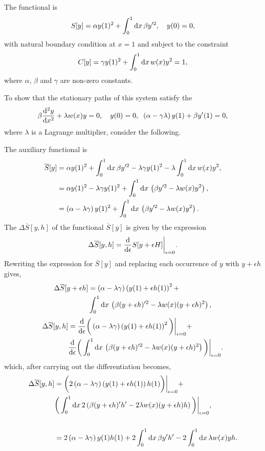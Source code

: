 The functional is
\begin{equation*}
S[y] = \alpha y(1)^2 + \int_{0}^{1}\mathrm{d} x\, \beta y^{\prime 2},\quad y(0) = 0,
\end{equation*}
with natural boundary condition at $x=1$ and subject to the constraint
\[
	C[y] = \gamma y(1)^2 + \int_{0}^{1}\mathrm{d} x\, w(x) y^2 = 1,
\]
where $\alpha$, $\beta$ and $\gamma$ are non-zero constants. 

To show that the stationary paths of this system satisfy the \el 
\[
	\beta \frac{\mathrm{d}^2y}{\mathrm{d}x^2} +  \lambda w(x) y = 0,\quad y(0)=0,\;\; \left(\alpha-\gamma\lambda\right) y(1) + \beta y^\prime(1)=0,
\]
where $\lambda$ is a Lagrange multiplier, consider the following.

The auxiliary functional is
\begin{align*}
	\overline{S}[y] &= \alpha y(1)^2 + \int_{0}^{1}\mathrm{d} x\, \beta y^{\prime 2} - \lambda\gamma y(1)^2 - \lambda\int_{0}^{1}\mathrm{d} x\, w(x) y^2,\\
	&= \alpha y(1)^2 - \lambda\gamma y(1)^2 + \int_{0}^{1}\mathrm{d} x\, \left(\beta y^{\prime 2}  -  \lambda w(x) y^2\right),\\
	&= \left(\alpha- \lambda\gamma\right) y(1)^2 + \int_{0}^{1}\mathrm{d} x\, \left(\beta y^{\prime 2}  - \lambda w(x) y^2\right).
\end{align*}
The \gd $\Delta \overline{S}[y,h]$ of the functional $\overline{S}[y]$ is given by the expression
\[
	\Delta \overline{S}[y,h] = \frac{\mathrm{d}}{\mathrm{d}\epsilon}S[y+\epsilon H]\bigg |_{\epsilon=0}.
\]
Rewriting the expression for $\overline{S}[y]$ and replacing each occurrence of $y$ with $y+\epsilon h$ gives,
\begin{align*}
	\Delta \overline{S}[y+\epsilon h] &= \left(\alpha- \lambda\gamma\right) \left(y(1)+\epsilon h(1)\right)^2 +\\ 
	&\int_{0}^{1}\mathrm{d} x\, \left(\beta (y+\epsilon h)^{\prime 2}  - \lambda w(x) (y+\epsilon h)^2\right),
\end{align*}
\begin{align*}
	\Delta \overline{S}[y,h] &= \frac{\mathrm{d}}{\mathrm{d}\epsilon}\bigg(\left(\alpha- \lambda\gamma\right) \left(y(1)+\epsilon h(1)\right)^2\bigg)\bigg|_{\epsilon=0} + \\
	&\frac{\mathrm{d}}{\mathrm{d}\epsilon}\bigg(\int_{0}^{1}\mathrm{d} x\, \left(\beta (y+\epsilon h)^{\prime 2}  -  \lambda w(x) (y+\epsilon h)^2\right)\bigg)\bigg|_{\epsilon=0}.
\end{align*}
which, after carrying out the differentiation becomes,
\begin{align*}
	\Delta \overline{S}[y,h] &= \bigg(2\left(\alpha- \lambda\gamma\right) \left(y(1)+\epsilon h(1)\right) h(1)\bigg)\bigg|_{\epsilon=0} + \\
	&\bigg(\int_{0}^{1}\mathrm{d} x\, 2\left(\beta (y+\epsilon h)^{\prime}h^\prime  -  
	2\lambda w(x) (y+\epsilon h)h\right)\bigg)\bigg|_{\epsilon=0},\\
	\\
	&= 2\left(\alpha- \lambda\gamma\right) y(1)h(1) + 2\int_{0}^{1}\mathrm{d} x\, \beta y^{\prime}h^\prime  -  2\int_{0}^{1}\mathrm{d} x\, \lambda w(x) yh.
\end{align*}
